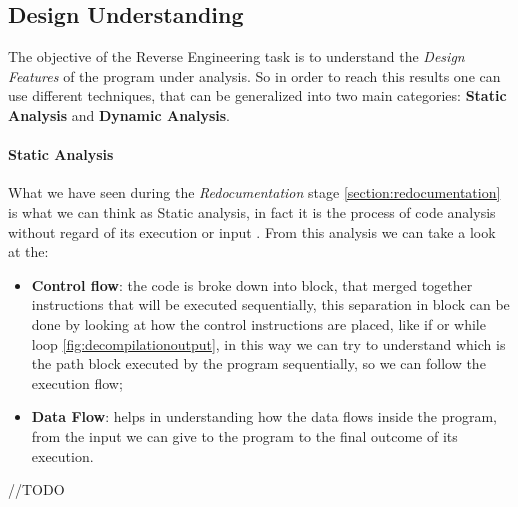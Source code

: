 \documentclass{article}
\begin{document}
\clearpage

\subsection{Design Understanding}
The objective of the Reverse Engineering task is to understand the \textit{Design Features} of the program under analysis. So in order to reach this results one can use different techniques, that can be generalized into two main categories: \textbf{Static Analysis} and \textbf{Dynamic Analysis}.

\paragraph{Static Analysis}
What we have seen during the \textit{Redocumentation} stage \ref{section:redocumentation} is what we can think as Static analysis, in fact it is the process of code analysis without regard of its execution or input \citep{LessonReverse}.
From this analysis we can take a look at the:
\begin{itemize}
    \item \textbf{Control flow}: the code is broke down into block, that merged together instructions that will be executed sequentially, this separation in block can be done by looking at how the control instructions are placed, like if or while loop \ref{fig:decompilationoutput}, in this way we can try to understand which is the path block executed by the program sequentially, so we can follow the execution flow;
    \item \textbf{Data Flow}: helps in understanding how the data flows inside the program, from the input we can give to the program to the final outcome of its execution.
\end{itemize}
//TODO
\end{document}
